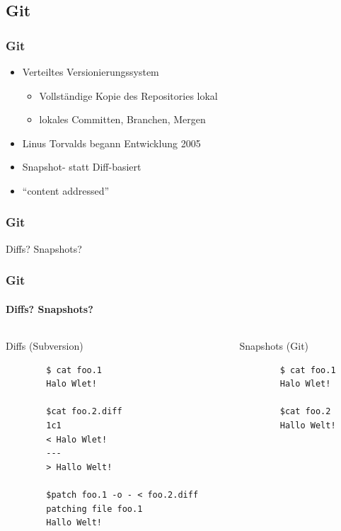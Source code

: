 \documentclass[]{beamer}
\begin{document}
\subsection{Git}
\begin{frame}
	\frametitle{Git}
	\begin{itemize}
		\item
			Verteiltes Versionierungssystem
			\begin{itemize}
				\item
					Vollständige Kopie des Repositories lokal
				\item
					lokales Committen, Branchen, Mergen
			\end{itemize}
		\item
			Linus Torvalds begann Entwicklung 2005
		\item
			Snapshot- statt Diff-basiert
		\item
			``content addressed''
	\end{itemize}
\end{frame}

\begin{frame}
	\frametitle{Git}
	\Huge{Diffs? Snapshots?}
\end{frame}

\begin{frame}[fragile]
	\frametitle{Git}
	\framesubtitle{Diffs? Snapshots?}
	\begin{columns}[T]
		\begin{column}{4.5cm}
		\huge{Diffs} \normalsize (Subversion)

		\begin{verbatim}
		$ cat foo.1
		Halo Wlet!

		$cat foo.2.diff
		1c1
		< Halo Wlet!
		---
		> Hallo Welt!

		$patch foo.1 -o - < foo.2.diff
		patching file foo.1
		Hallo Welt!
		\end{verbatim}
		\end{column}

		\begin{column}{4.5cm}
		\huge{Snapshots} \normalsize (Git)

		\begin{verbatim}
		$ cat foo.1
		Halo Wlet!

		$cat foo.2
		Hallo Welt!
		\end{verbatim}
		\end{column}
	\end{columns}
\end{frame}
\end{document}
